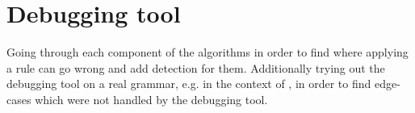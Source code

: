\section{Debugging tool}
Going through each component of the algorithms in order to find where applying a rule can go wrong and add detection for them. Additionally trying out the debugging tool on a real grammar, e.g. in the context of \cite{listenmaa-etal-2021-towards}, in order to find edge-cases which were not handled by the debugging tool.


% 

